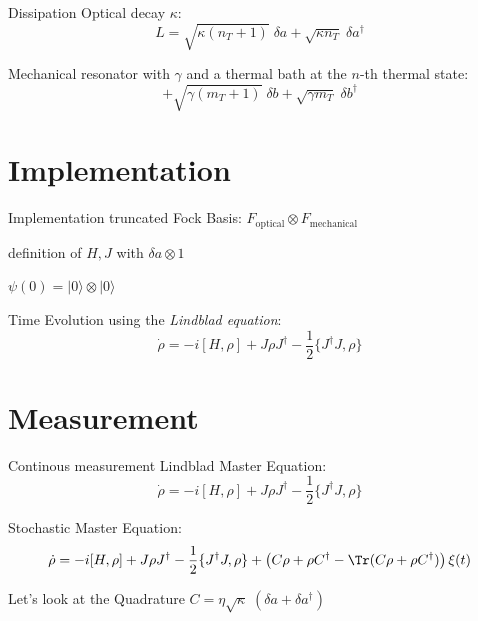 \begin{frame}{Dissipation}
	Optical decay $\kappa$:
	$$L = \sqrt{\kappa (n_T+1)} \;\delta a 
		+ \sqrt{\kappa n_T} \; \delta a^\dagger$$
	
	Mechanical resonator with $\gamma$ and a thermal bath at the $n$-th thermal state:
	$$
		+ \sqrt{\gamma (m_T+1)} \;\delta b 
		+ \sqrt{\gamma m_T} \; \delta b^\dagger
	$$
\end{frame}

\section{Implementation}
\begin{frame}{Implementation}
truncated Fock Basis: $F_\text{optical} \otimes F_\text{mechanical}$

definition of $H, J$ with $\delta a \otimes 1$

$\psi(0) = |0\rangle \otimes |0\rangle$

Time Evolution using the \emph{Lindblad equation}: 
$$
	\dot\rho = -i[H,\rho] + J\rho J^\dagger - \frac{1}{2} \{J^\dagger J, \rho\}
$$
\end{frame}

\section{Measurement}
\begin{frame}{Continous measurement}
	\textcolor{seegrau}{
		Lindblad Master Equation:
		$$\dot\rho = -i[H,\rho] + J\rho J^\dagger - \frac{1}{2} \{J^\dagger J, \rho\}$$
	}

	Stochastic Master Equation:
	$$
		\dot\rho 
		= -i[H,\rho] 
		+ J\rho J^\dagger - \frac{1}{2} \{J^\dagger J, \rho\} 
		+ \left(C\rho + \rho C^\dagger - \Tr(C\rho + \rho C^\dagger)\right)\xi(t)
	$$

	Let's look at the Quadrature $C = \eta\sqrt{\kappa}\;(\delta a + \delta a^\dagger)$

\end{frame}


